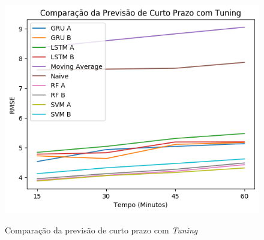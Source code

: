 \begin{figure}[H]
    \centering
    \includegraphics[scale=0.8]{monography/img/comparisons/comparacao_da_previsao_de_curto_prazo_com_tuning_rmse.png}
    \label{figure:pred_tuning}
    \caption{Comparação da previsão de curto prazo com \textit{Tuning}}
\end{figure}



